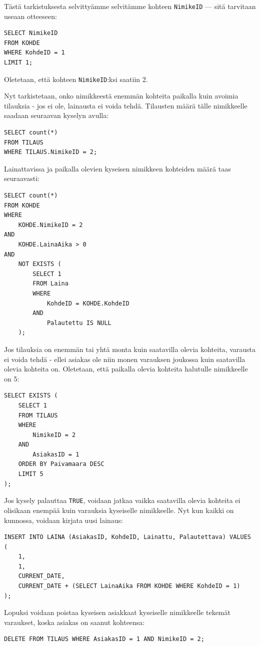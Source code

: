 \documentclass{article}
\begin{document}
Tästä tarkistuksesta selvittyämme selvitämme kohteen \texttt{NimikeID} --- sitä tarvitaan useaan otteeseen:

\begin{lstlisting}
SELECT NimikeID
FROM KOHDE
WHERE KohdeID = 1
LIMIT 1;
\end{lstlisting}

Oletetaan, että kohteen \texttt{NimikeID}:ksi saatiin 2.

Nyt tarkistetaan, onko nimikkeestä enemmän kohteita paikalla kuin avoimia tilauksia - jos ei ole, lainausta ei voida tehdä. Tilausten määrä tälle nimikkeelle saadaan seuraavan kyselyn avulla:

\begin{lstlisting}
SELECT count(*)
FROM TILAUS
WHERE TILAUS.NimikeID = 2;
\end{lstlisting}

Lainattavissa ja paikalla olevien kyseisen nimikkeen kohteiden määrä taas seuraavasti:

\begin{lstlisting}
SELECT count(*) 
FROM KOHDE
WHERE
    KOHDE.NimikeID = 2
AND
    KOHDE.LainaAika > 0
AND
    NOT EXISTS (
        SELECT 1
        FROM Laina
        WHERE
            KohdeID = KOHDE.KohdeID
        AND
            Palautettu IS NULL
    );
\end{lstlisting}

Jos tilauksia on enemmän tai yhtä monta kuin saatavilla olevia kohteita, varausta ei voida tehdä - ellei asiakas ole niin monen varauksen joukossa kuin saatavilla olevia kohteita on. Oletetaan, että paikalla olevia kohteita halutulle nimikkeelle on 5:

\begin{lstlisting}
SELECT EXISTS (
    SELECT 1
    FROM TILAUS
    WHERE
        NimikeID = 2
    AND
        AsiakasID = 1
    ORDER BY Paivamaara DESC
    LIMIT 5
);
\end{lstlisting}

Jos kysely palauttaa \texttt{TRUE}, voidaan jatkaa vaikka saatavilla olevia kohteita ei olisikaan enempää kuin varauksia kyseiselle nimikkeelle. Nyt kun kaikki on kunnossa, voidaan kirjata uusi lainaus:

\begin{lstlisting}
INSERT INTO LAINA (AsiakasID, KohdeID, Lainattu, Palautettava) VALUES (
    1,
    1,
    CURRENT_DATE,
    CURRENT_DATE + (SELECT LainaAika FROM KOHDE WHERE KohdeID = 1)
);
\end{lstlisting}

Lopuksi voidaan poistaa kyseisen asiakkaat kyseiselle nimikkeelle tekemät varaukset, koska asiakas on saanut kohteensa:

\begin{lstlisting}
DELETE FROM TILAUS WHERE AsiakasID = 1 AND NimikeID = 2;
\end{lstlisting}
\end{document}
